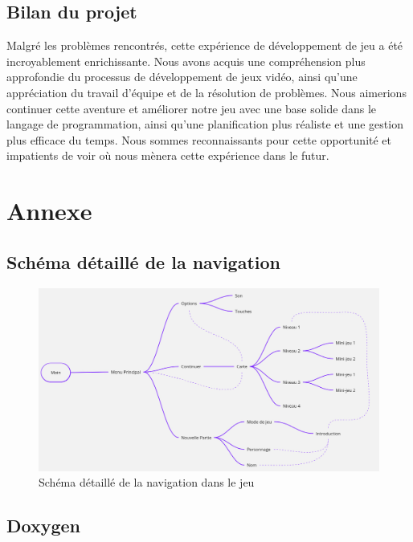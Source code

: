 \documentclass[12pt,a4paper]{article}
\begin{document}
        \subsection{Bilan du projet}
            \tabto{1cm} Malgré les problèmes rencontrés, cette expérience de développement de jeu a été incroyablement enrichissante. Nous avons acquis une compréhension plus approfondie du processus de développement de jeux vidéo, ainsi qu'une appréciation du travail d'équipe et de la résolution de problèmes. Nous aimerions continuer cette aventure et améliorer notre jeu avec une base solide dans le langage de programmation, ainsi qu'une planification plus réaliste et une gestion plus efficace du temps. Nous sommes reconnaissants pour cette opportunité et impatients de voir où nous mènera cette expérience dans le futur.

    \section{Annexe}

        \subsection{Schéma détaillé de la navigation}
            \label{subsec:schéma_navigation_detaille}

            \begin{figure}[h]
                \centering
                \includegraphics[width=13cm]{images/schéma_navigation_détaillé.png}
                \caption{Schéma détaillé de la navigation dans le jeu}
            \end{figure}

        \newpage

        \subsection{Doxygen}
            \label{subsec:doxygen}
            
\end{document}
